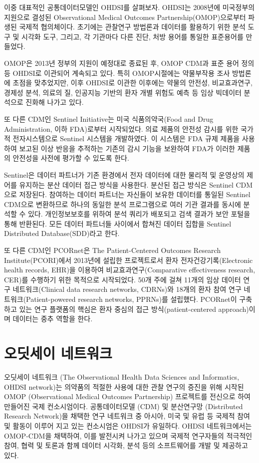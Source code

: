 \documentclass[]{book}
\begin{document}
이중 대표적인 공통데이터모델인 OHDSI를 살펴보자. OHDSI는 2008년에
미국정부의 지원으로 결성된 Observational Medical Outcomes
Partnership(OMOP)으로부터 파생된 국제적 협의체이다. 초기에는 관찰연구
방법론과 데이터를 활용하기 위한 분석 도구 및 시각화 도구, 그리고, 각
기관마다 다른 진단, 처방 용어를 통일한 표준용어를 만들었다.

OMOP은 2013년 정부의 지원이 예정대로 종료된 후, OMOP CDM과 표준 용어
정의 등 OHDSI로 이관되어 계속되고 있다. 특히 OMOP시절에는 약물부작용
조사 방법론에 초점을 맞추었지만, 이후 OHDSI로 이관한 이후에는 약물의
안전성, 비교효과연구, 경제성 분석, 의료의 질, 인공지능 기반의 환자 개별
위험도 예측 등 임상 빅데이터 분석으로 진화해 나가고 있다.

또 다른 CDM인 Sentinel Initiative는 미국 식품의약국(Food and Drug
Administration, 이하 FDA)로부터 시작되었다. 의료 제품의 안전성 감시를
위한 국가적 전자시스템으로 Sentinel 시스템을 개발하였다. 이 시스템은 FDA
규제 제품을 사용하여 보고된 이상 반응을 추적하는 기존의 감시 기능을
보완하여 FDA가 이러한 제품의 안전성을 사전에 평가할 수 있도록 한다.

Sentinel은 데이터 파트너가 기존 환경에서 전자 데이터에 대한 물리적 및
운영상의 제어를 유지하는 분산 데이터 접근 방식을 사용한다. 분산된 접근
방식은 Sentinel CDM으로 저장된다. 참여하는 데이터 파트너는 자신들이
보유한 데이터를 통일된 Sentinel CDM으로 변환하므로 하나의 동일한 분석
프로그램으로 여러 기관 결과를 동시에 분석할 수 있다. 개인정보보호를
위하여 분석 쿼리가 배포되고 검색 결과가 보안 포털을 통해 반환된다. 모든
데이터 파트너들 사이에서 합쳐진 데이터 집합을 Sentinel Distributed
Database(SDD)라고 한다.

또 다른 CDM인 PCORnet은 The Patient-Centered Outcomes Research
Institute(PCORI)에서 2013년에 설립한 프로젝트로서 환자
전자건강기록(Electronic health records, EHR)을 이용하여
비교효과연구(Comparative effectiveness research, CER)를 수행하기 위한
목적으로 시작되었다. 50개 주에 걸쳐 11개의 임상 데이터 연구
네트워크(Clinical data research networks, CDRNs)와 18개의 환자 참여 연구
네트워크(Patient-powered research networks, PPRNs)를 설립했다. PCORnet이
구축하고 있는 연구 플랫폼의 핵심은 환자 중심의 접근
방식(patient-centered approach)이며 데이터는 중추 역할을 한다.

\section{오딧세이 네트워크}\label{OHDSINetwork}

오딧세이 네트워크 (The Observational Health Data Sciences and
Informatics, OHDSI network)는 의약품의 적절한 사용에 대한 관찰 연구의
증진을 위해 시작된 OMOP (Observational Medical Outcomes Partnership)
프로젝트를 전신으로 하여 만들어진 국제 컨소시엄이다. 공통데이터모델
(CDM) 및 분산연구망 (Distributed Research Network)을 채택한 연구
네트워크 중 아시아, 미국 및 유럽 등 국제적 참여 및 활동이 이루어 지고
있는 컨소시엄은 OHDSI가 유일하다. OHDSI 네트워크에서는 OMOP-CDM을
채택하여, 이를 발전시켜 나가고 있으며 국제적 연구자들의 적극적인 참여,
협력 및 토론과 함께 데이터 시각화, 분석 등의 소프트웨어를 개발 및
제공하고 있다.
\end{document}
